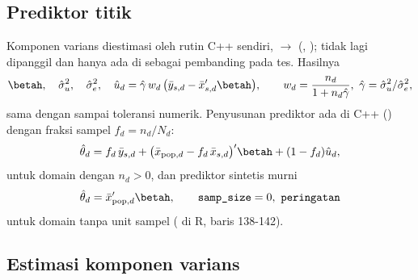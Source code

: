 \subsection{Prediktor titik}\label{sec:bhf-prediktor}

Komponen varians diestimasi oleh rutin C++ sendiri, 
$\to$  (,
);  tidak lagi dipanggil dan hanya
ada di  sebagai pembanding pada tes. Hasilnya
\begin{equation}
  \betah,\quad \hat\sigma_u^2,\quad \hat\sigma_e^2,\quad
  \hat u_d=\hat\gamma\,w_d\,\bigl(\bar y_{s,d}-\bar x_{s,d}'\betah\bigr),
  \qquad w_d=\frac{n_d}{1+n_d\hat\gamma},\ \hat\gamma=\hat\sigma_u^2/\hat\sigma_e^2,
  \label{eq:bhf-lmer}
\end{equation}
sama dengan 
sampai toleransi numerik. Penyusunan prediktor ada di C++
() dengan fraksi sampel $f_d=n_d/N_d$:
\begin{equation}
  \hat\theta_d
  = f_d\,\bar y_{s,d}
  + \bigl(\bar x_{\text{pop},d}-f_d\,\bar x_{s,d}\bigr)'\betah
  + (1-f_d)\hat u_d,
  \label{eq:bhf-pred}
\end{equation}
untuk domain dengan $n_d>0$, dan prediktor sintetis murni
\begin{equation}
  \hat\theta_d=\bar x_{\text{pop},d}'\betah,
  \qquad \texttt{samp\_size}=0,\ \texttt{peringatan}
  \label{eq:bhf-unsampled}
\end{equation}
untuk domain tanpa unit sampel ( di R, baris 138-142).


\subsection{Estimasi komponen varians}\label{sec:bhf-varians}


